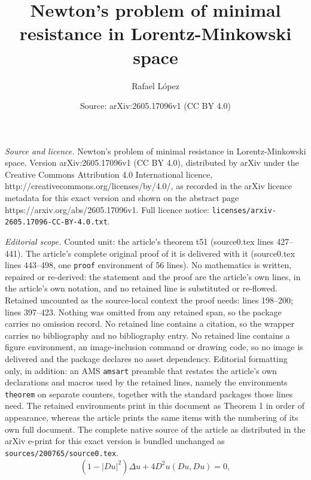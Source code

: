 \documentclass[10pt,a4paper]{amsart}
\title{Newton's problem of minimal resistance in Lorentz-Minkowski space}
\author{Rafael L\'opez}
\date{Source: arXiv:2605.17096v1 (CC BY 4.0)}
\begin{document}
\maketitle

\noindent\emph{Source and licence.} Newton's problem of minimal resistance in Lorentz-Minkowski space. Version arXiv:2605.17096v1 (CC BY 4.0), distributed by arXiv under the Creative Commons Attribution 4.0 International licence, http://creativecommons.org/licenses/by/4.0/, as recorded in the arXiv licence metadata for this exact version and shown on the abstract page https://arxiv.org/abs/2605.17096v1. Full licence notice: \texttt{licenses/arxiv-2605.17096-CC-BY-4.0.txt}.\par\smallskip

\noindent\textit{Editorial scope.} Counted unit: the article's theorem t51 (source0.tex lines 427--441). The article's complete original proof of it is delivered with it (source0.tex lines 443--498, one \texttt{proof} environment of 56 lines). No mathematics is written, repaired or re-derived: the statement and the proof are the article's own lines, in the article's own notation, and no retained line is substituted or re-flowed.  Retained uncounted as the source-local context the proof needs: lines 198--200; lines 397--423.  Nothing was omitted from any retained span, so the package carries no omission record.  No retained line contains a citation, so the wrapper carries no bibliography and no bibliography entry.  No retained line contains a figure environment, an image-inclusion command or drawing code, so no image is delivered and the package declares no asset dependency.  Editorial formatting only, in addition: an AMS \texttt{amsart} preamble that restates the article's own declarations and macros used by the retained lines, namely the environments \texttt{theorem} on separate counters, together with the standard packages those lines need.  The retained environments print in this document as Theorem 1 in order of appearance, whereas the article prints the same items with the numbering of its own full document.  The complete native source of the article as distributed in the arXiv e-print for this exact version is bundled unchanged as \texttt{sources/200765/source0.tex}.
\begin{equation}\label{eqs}
(1-|Du|^2)\Delta u+4 D^2u(Du,Du)=0,
\end{equation}
\end{document}
